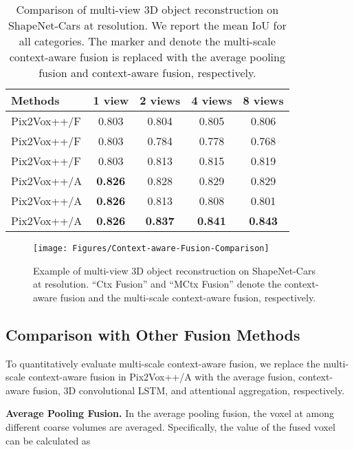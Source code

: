 \documentclass[twocolumn]{svjour3}
\begin{document}
\begin{table}[!t]
  \centering
  \caption{Comparison of multi-view 3D object reconstruction on ShapeNet-Cars at  resolution. We report the mean IoU for all categories. The marker  and  denote the multi-scale context-aware fusion is replaced with the average pooling fusion and context-aware fusion, respectively.}
  \begin{tabularx}{\linewidth}{lcccc}
    \toprule
    Methods        & 1 view    & 2 views   & 4 views   & 8 views\\
    \midrule
    Pix2Vox++/F 
                   & 0.803     & 0.804     & 0.805     & 0.806 \\
    Pix2Vox++/F 
                   & 0.803     & 0.784     & 0.778     & 0.768 \\
    Pix2Vox++/F    & 0.803     & 0.813     & 0.815     & 0.819 \\
    \midrule
    Pix2Vox++/A 
                   & \bf{0.826}& 0.828     & 0.829     & 0.829 \\
    Pix2Vox++/A 
                   & \bf{0.826}& 0.813     & 0.808     & 0.801 \\
    Pix2Vox++/A    & \bf{0.826}& \bf{0.837}& \bf{0.841}& \bf{0.843}\\
    \bottomrule
  \end{tabularx}
  \label{tab:shapenet-context-aware-fusion-high-resolution}
\end{table}

\begin{figure}
  \resizebox{\linewidth}{!} {
    \texttt{[image: Figures/Context-aware-Fusion-Comparison]}
  }
  \caption{Example of multi-view 3D object reconstruction on ShapeNet-Cars at  resolution. ``Ctx Fusion'' and ``MCtx Fusion'' denote the context-aware fusion and the multi-scale context-aware fusion, respectively.}
  \label{fig:multi-scale-context-aware-fusion-comparison}
\end{figure}

\subsection{Comparison with Other Fusion Methods}

To quantitatively evaluate multi-scale context-aware fusion, we replace the multi-scale context-aware fusion in Pix2Vox++/A with the average fusion, context-aware fusion, 3D convolutional LSTM, and attentional aggregation, respectively.

\noindent \textbf{Average Pooling Fusion.}
In the average pooling fusion, the voxel at  among different coarse volumes are averaged.
Specifically, the value of the fused voxel  can be calculated as
\end{document}

